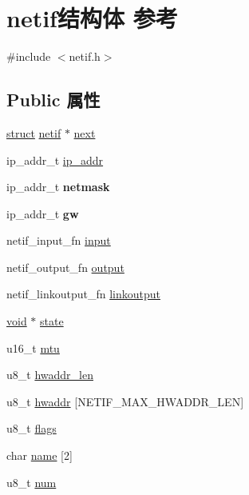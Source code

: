 \hypertarget{structnetif}{}\section{netif结构体 参考}
\label{structnetif}


{\ttfamily \#include $<$netif.\+h$>$}

\subsection*{Public 属性}
\begin{DoxyCompactItemize}
\item 
\hyperlink{interfacestruct}{struct} \hyperlink{structnetif}{netif} $\ast$ \hyperlink{structnetif_ae77736b64df442242795220d76be6b86}{next}
\item 
ip\+\_\+addr\+\_\+t \hyperlink{structnetif_a9776aaee37ea8f07b9ddc0f8b4e7e866}{ip\+\_\+addr}
\item 
\mbox{\label{structnetif_a5192f2fa2533f13cfde07d9d5bb0db2b}} 
ip\+\_\+addr\+\_\+t {\bfseries netmask}
\item 
\mbox{\label{structnetif_a353875b68ea303d237d1c3406134ec76}} 
ip\+\_\+addr\+\_\+t {\bfseries gw}
\item 
netif\+\_\+input\+\_\+fn \hyperlink{structnetif_a8fe4f1b7b0d710216287da9615164a5c}{input}
\item 
netif\+\_\+output\+\_\+fn \hyperlink{structnetif_a8e1dcfe65db487feecd244355f39215e}{output}
\item 
netif\+\_\+linkoutput\+\_\+fn \hyperlink{structnetif_acaaac9b415a7be73eb8a287c8ed18a8d}{linkoutput}
\item 
\hyperlink{interfacevoid}{void} $\ast$ \hyperlink{structnetif_a809cc57c0dff09c5c9ae45b02c2002f3}{state}
\item 
u16\+\_\+t \hyperlink{structnetif_aca7d56b4e0f822b0ced2885f222b8d48}{mtu}
\item 
u8\+\_\+t \hyperlink{structnetif_afe1181561cb16241f3cb5ed01e567d42}{hwaddr\+\_\+len}
\item 
u8\+\_\+t \hyperlink{structnetif_ab91f76223d5a7f1a64f03ac9dd7113a4}{hwaddr} \mbox{[}N\+E\+T\+I\+F\+\_\+\+M\+A\+X\+\_\+\+H\+W\+A\+D\+D\+R\+\_\+\+L\+EN\mbox{]}
\item 
u8\+\_\+t \hyperlink{structnetif_a1c171db6097bbb6f09f63549a66e00ea}{flags}
\item 
char \hyperlink{structnetif_a32fca6ffd28bb9af3f891a378827a67e}{name} \mbox{[}2\mbox{]}
\item 
u8\+\_\+t \hyperlink{structnetif_ab7ef01e505dd2feb781fe86756b1c973}{num}
\end{DoxyCompactItemize}



